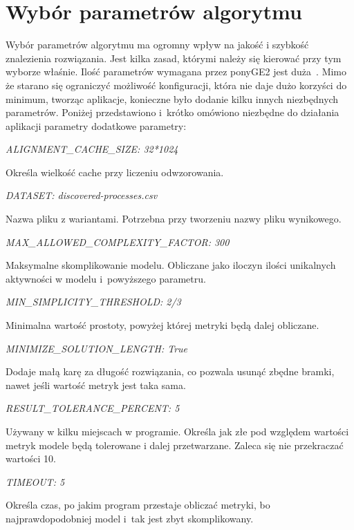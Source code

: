 \section{Wybór parametrów algorytmu}
Wybór parametrów algorytmu ma ogromny wpływ na jakość i szybkość znalezienia rozwiązania. Jest kilka zasad, którymi należy się kierować przy tym wyborze właśnie. Ilość parametrów wymagana przez ponyGE2 jest duża~\cite{PonyGE2-wiki}. Mimo że starano się ograniczyć możliwość konfiguracji, która nie daje dużo korzyści do minimum, tworząc aplikacje, konieczne było dodanie kilku innych niezbędnych parametrów. Poniżej przedstawiono i~krótko omówiono niezbędne do działania aplikacji parametry dodatkowe parametry: \newline
\begin{center}
\textit{ALIGNMENT\_CACHE\_SIZE:           32*1024}
\end{center}
Określa wielkość cache przy liczeniu odwzorowania.
\begin{center}
\textit{DATASET:                        discovered-processes.csv}
\end{center}
Nazwa pliku z wariantami. Potrzebna przy tworzeniu nazwy pliku wynikowego.
\begin{center}
\textit{MAX\_ALLOWED\_COMPLEXITY\_FACTOR:  300}
\end{center}
Maksymalne skomplikowanie modelu. Obliczane jako iloczyn ilości unikalnych aktywności w modelu i~powyższego parametru.
\begin{center}
\textit{MIN\_SIMPLICITY\_THRESHOLD:       2/3}
\end{center}
Minimalna wartość prostoty, powyżej której metryki będą dalej obliczane. 
\begin{center}
\textit{MINIMIZE\_SOLUTION\_LENGTH:       True}
\end{center}
Dodaje małą karę za długość rozwiązania, co pozwala usunąć zbędne bramki, nawet jeśli wartość metryk jest taka sama.
\begin{center}
\textit{RESULT\_TOLERANCE\_PERCENT:       5}
\end{center}
Używany w kilku miejscach w programie. Określa jak złe pod względem wartości metryk modele będą tolerowane i dalej przetwarzane. Zaleca się nie przekraczać wartości 10.
\begin{center}
\textit{TIMEOUT:                        5}
\end{center}
Określa czas, po jakim program przestaje obliczać metryki, bo najprawdopodobniej model i~tak jest zbyt skomplikowany.

